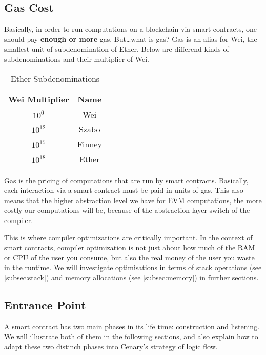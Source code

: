 \documentclass{article}
\begin{document}
\subsection{Gas Cost}
\par Basically, in order to run computations on a blockchain via smart contracts, one should pay \textbf{enough or more} gas. But\ldots what is gas? Gas is an alias for Wei, the smallest unit of subdenomination of Ether. Below are differend kinds of subdenominations and their multiplier of Wei.

\begin{table}[h]
  \centering
  \begin{tabular}{|c|c|}
    \hline
    \textbf{Wei Multiplier} & \textbf{Name} \\
    \hline
    $ 10^0 $ & Wei \\
    \hline
    $ 10^12 $ & Szabo \\
    \hline
    $ 10^15 $ & Finney \\
    \hline
    $ 10^18 $ & Ether \\
    \hline
  \end{tabular}
  \caption{Ether Subdenominations}
  \label{tab:ether_subdenominations}
\end{table}
\par Gas is the pricing of computations that are run by smart contracts. Basically, each interaction via a smart contract must be paid in units of gas. This also means that the higher abstraction level we have for EVM computations, the more costly our computations will be, because of the abstraction layer switch of the compiler.
\newpage
\par This is where compiler optimizations are critically important. In the context of smart contracts, compiler optimization is not just about how much of the RAM or CPU of the user you consume, but also the real money of the user you waste in the runtime. We will investigate optimisations in terms of stack operations (see \ref{subsec:stack}) and memory allocations (see \ref{subsec:memory}) in further sections.

\subsection{Entrance Point}
\par A smart contract has two main phases in its life time: construction and listening. We will illustrate both of them in the following sections, and also explain how to adapt these two distinch phases into Cenary's strategy of logic flow.
\end{document}
